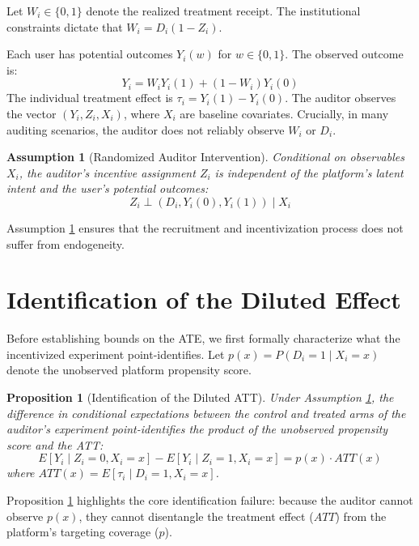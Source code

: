 \documentclass[11pt]{article}
\newtheorem{assumption}{Assumption}
\newtheorem{proposition}{Proposition}
\begin{document}
Let $W_i \in \{0,1\}$ denote the realized treatment receipt. The institutional constraints dictate that $W_i = D_i(1-Z_i)$. 

Each user has potential outcomes $Y_i(w)$ for $w \in \{0,1\}$. The observed outcome is:
\begin{equation}
    Y_i = W_i Y_i(1) + (1-W_i) Y_i(0)
\end{equation}
The individual treatment effect is $\tau_i = Y_i(1) - Y_i(0)$. The auditor observes the vector $(Y_i, Z_i, X_i)$, where $X_i$ are baseline covariates. Crucially, in many auditing scenarios, the auditor does not reliably observe $W_i$ or $D_i$.

\begin{assumption}[Randomized Auditor Intervention]
\label{ass:randomization}
Conditional on observables $X_i$, the auditor's incentive assignment $Z_i$ is independent of the platform's latent intent and the user's potential outcomes:
\[ Z_i \perp (D_i, Y_i(0), Y_i(1)) \mid X_i \]
\end{assumption}

Assumption \ref{ass:randomization} ensures that the recruitment and incentivization process does not suffer from endogeneity.

\section{Identification of the Diluted Effect}
Before establishing bounds on the ATE, we first formally characterize what the incentivized experiment point-identifies. Let $p(x) = P(D_i=1 \mid X_i=x)$ denote the unobserved platform propensity score.

\begin{proposition}[Identification of the Diluted ATT]
\label{prop:diluted}
Under Assumption \ref{ass:randomization}, the difference in conditional expectations between the control and treated arms of the auditor's experiment point-identifies the product of the unobserved propensity score and the ATT:
\begin{equation}
    E[Y_i \mid Z_i=0, X_i=x] - E[Y_i \mid Z_i=1, X_i=x] = p(x) \cdot ATT(x)
\end{equation}
where $ATT(x) = E[\tau_i \mid D_i=1, X_i=x]$.
\end{proposition}

Proposition \ref{prop:diluted} highlights the core identification failure: because the auditor cannot observe $p(x)$, they cannot disentangle the treatment effect ($ATT$) from the platform's targeting coverage ($p$).
\end{document}
